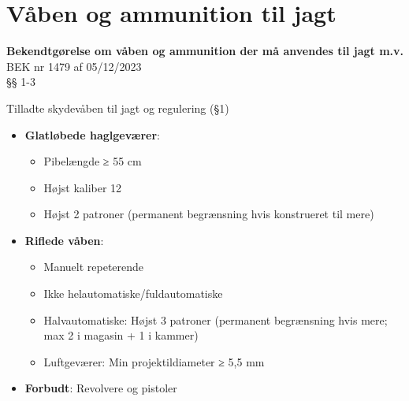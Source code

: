 \section{Våben og ammunition til jagt}

\begin{frame}
  \vspace{3em}
  \begin{center}
    {\LARGE \textbf{Bekendtgørelse om våben og ammunition der må anvendes til jagt m.v.}} \\
    \vspace{1em}
    BEK nr 1479 af 05/12/2023 \\ §§ 1-3
  \end{center}
\end{frame}

\begin{frame}{Tilladte skydevåben til jagt og regulering (§1)}
    \begin{itemize}
        \item \textbf{Glatløbede haglgeværer}:
          \begin{itemize}
            \item Pibelængde ≥ 55 cm
            \item Højst kaliber 12
            \item Højst 2 patroner (permanent begrænsning hvis konstrueret til mere)
          \end{itemize}
        \item \textbf{Riflede våben}:
          \begin{itemize}
            \item Manuelt repeterende
            \item Ikke helautomatiske/fuldautomatiske
            \item Halvautomatiske: Højst 3 patroner (permanent begrænsning hvis mere; max 2 i magasin + 1 i kammer)
            \item Luftgeværer: Min projektildiameter ≥ 5,5 mm
          \end{itemize}
        \item \textbf{Forbudt}: Revolvere og pistoler
    \end{itemize}
\end{frame}

